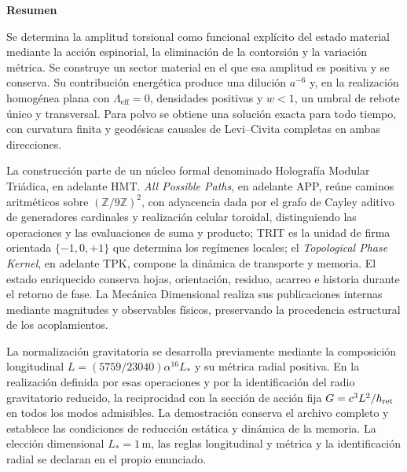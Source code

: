 
\begin{center}\bfseries Resumen\end{center}
\begingroup
\fontsize{10}{12}\selectfont
\setlength{\parskip}{2pt plus 1pt minus .5pt}
\noindent
Se determina la amplitud torsional como funcional explícito del estado
material mediante la acción espinorial, la eliminación de la contorsión
y la variación métrica. Se construye un sector material en el que esa
amplitud es positiva y se conserva. Su contribución energética produce
una dilución \(a^{-6}\) y, en la realización homogénea plana con
\(\Lambda_{\mathrm{eff}}=0\), densidades positivas y \(w<1\), un umbral
de rebote único y transversal. Para polvo se obtiene una solución exacta
para todo tiempo, con curvatura finita y geodésicas causales de
Levi--Civita completas en ambas direcciones.

La construcción parte de un núcleo formal denominado Holografía Modular
Triádica, en adelante HMT. \emph{All Possible Paths}, en adelante APP,
reúne caminos aritméticos sobre \((\mathbb Z/9\mathbb Z)^2\), con
adyacencia dada por el grafo de Cayley aditivo de generadores cardinales
y realización celular toroidal, distinguiendo las operaciones y las
evaluaciones de suma y producto;
TRIT es la unidad de firma orientada \(\{-1,0,+1\}\) que determina los
regímenes locales; el \emph{Topological Phase Kernel}, en adelante TPK,
compone la dinámica de transporte y memoria. El estado enriquecido
conserva hojas, orientación, residuo, acarreo e historia durante el
retorno de fase. La Mecánica Dimensional realiza sus publicaciones
internas mediante magnitudes y observables físicos, preservando la
procedencia estructural de los acoplamientos.

La normalización gravitatoria se desarrolla previamente mediante la
composición longitudinal \(L=(5759/23040)\alpha^{16}L_*\) y su
métrica radial positiva. En la realización definida por esas operaciones
y por la identificación del radio gravitatorio reducido, la reciprocidad
con la sección de acción fija \(G=c^3L^2/\hbar_{\rm ret}\) en todos
los modos admisibles. La demostración conserva el archivo completo y
establece las condiciones de reducción estática y dinámica de la memoria.
La elección dimensional \(L_*=1\,\mathrm m\), las reglas longitudinal
y métrica y la identificación radial se declaran en el propio enunciado.

